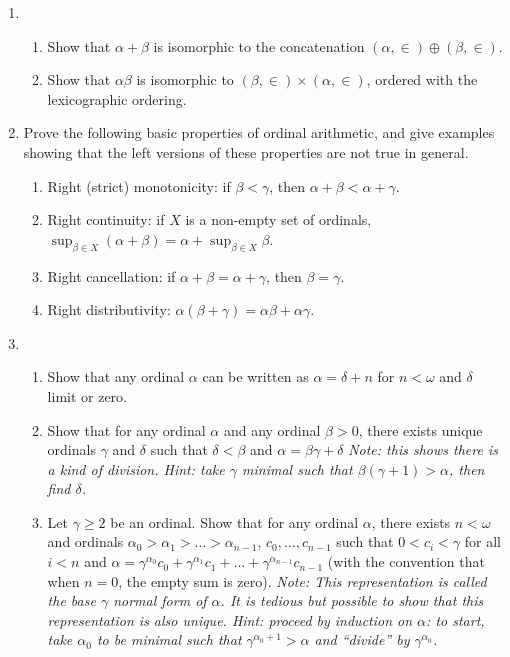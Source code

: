 \documentclass{amsart}
\theoremstyle{definition}
\begin{document}
\begin{enumerate}
\item
  \begin{enumerate}
  \item Show that $\alpha + \beta$ is isomorphic to the concatenation  $(\alpha, \in) \oplus (\beta, \in)$.
  \item Show that $\alpha \beta$ is isomorphic to $(\beta, \in) \times (\alpha, \in)$, ordered with the lexicographic ordering.
  \end{enumerate}
\item Prove the following basic properties of ordinal arithmetic, and give examples showing that the left versions of these properties are not true in general.

  \begin{enumerate}
  \item Right (strict) monotonicity: if $\beta < \gamma$, then $\alpha + \beta < \alpha + \gamma$.
  \item Right continuity: if $X$ is a non-empty set of ordinals, $\sup_{\beta \in X} (\alpha + \beta) = \alpha + \sup_{\beta \in X} \beta$.
  \item Right cancellation: if $\alpha + \beta = \alpha + \gamma$, then $\beta = \gamma$.
  \item Right distributivity: $\alpha (\beta + \gamma) = \alpha \beta + \alpha \gamma$.
  \end{enumerate}
\item \begin{enumerate}
\item Show that any ordinal $\alpha$ can be written as $\alpha = \delta + n$ for $n < \omega$ and $\delta$ limit or zero.
\item Show that for any ordinal $\alpha$ and any ordinal $\beta > 0$, there exists unique ordinals $\gamma$ and $\delta$ such that $\delta < \beta$ and $\alpha = \beta  \gamma + \delta$ \emph{Note: this shows there is a kind of division. Hint: take $\gamma$ minimal such that $\beta (\gamma + 1) > \alpha$, then find $\delta$.}
\item Let $\gamma \ge 2$ be an ordinal. Show that for any ordinal $\alpha$, there exists $n < \omega$ and ordinals $\alpha_0 > \alpha_1 > \ldots > \alpha_{n - 1}$, $c_0, \ldots, c_{n - 1}$ such that $0 < c_i < \gamma$ for all $i < n$ and $\alpha = \gamma^{\alpha_0} c_0 + \gamma^{\alpha_1} c_1 + \ldots + \gamma^{\alpha_{n - 1}}c_{n - 1}$ (with the convention that when $n = 0$, the empty sum is zero). \emph{Note: This representation is called the base $\gamma$ normal form of $\alpha$. It is tedious but possible to show that this representation is also unique. Hint: proceed by induction on $\alpha$: to start, take $\alpha_0$ to be minimal such that $\gamma^{\alpha_0 + 1} > \alpha$ and ``divide'' by $\gamma^{\alpha_0}$.}

\end{enumerate}
\end{enumerate}
\end{document}
